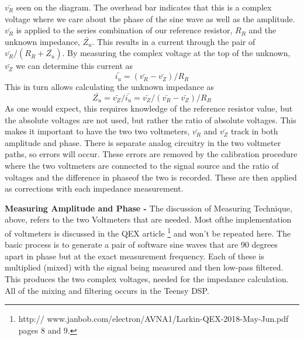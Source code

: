  \(\bar{v_R}\) seen on the diagram. 
The overhead bar indicates that this is a complex voltage where we care about the phase of the sine wave as well as the amplitude.  \(\bar{v_R}\) is applied to the series combination of our reference resistor, \(R_R\) and the unknown impedance, \(\bar{Z_u}\).  This results in a current through the pair  of \(\bar{v_R}/(R_R + \bar{Z_u})\).  By measuring the complex voltage at the top of the unknown, \(\bar{v_Z}\) we can determine this current as
\begin{equation}
 \bar{i_u}=(\bar{v_R} -\bar{v_Z})/R_R
\end{equation}
 This in turn allows calculating the unknown impedance as
\begin{equation}
 \bar{Z_u} = \bar{v_Z}/\bar{i_u}
                    = \bar{v_Z}/(\bar{v_R}-\bar{v_Z})/R_R
\end{equation}
As one would expect, this requires knowledge of the reference resistor value, but the absolute voltages are not used, but rather the ratio of absolute voltages.  This makes it important to have the two two voltmeters, \(\bar{v_R}\) and \(\bar{v_Z}\) track in both amplitude and phase.  There is separate analog circuitry in the two voltmeter paths, so errors will occur.  These errors are removed by the calibration procedure where the two voltmeters are connected to the signal source and the ratio  of voltages and the difference in phaseof the two is recorded.   These are then applied as corrections with each impedance measurement.

\textbf{Measuring Amplitude and Phase - }The discussion of Measuring Technique, above, refers to the two Voltmeters that are needed.  Most ofthe  implementation of voltmeters is discussed in the QEX article
%
\footnote{http:// www.janbob.com/electron/AVNA1/Larkin-QEX-2018-May-Jun.pdf pages 8 and 9.}
%
and won't be repeated here.  The basic process is to generate a pair of software sine waves that are 90 degrees apart in phase but at the exact measurement frequency.  Each of these is multiplied (mixed) with the signal being measured and then low-pass filtered.  This produces the two complex voltages, needed for the impedance calculation.  All of the mixing and filtering occurs in the Teensy DSP.